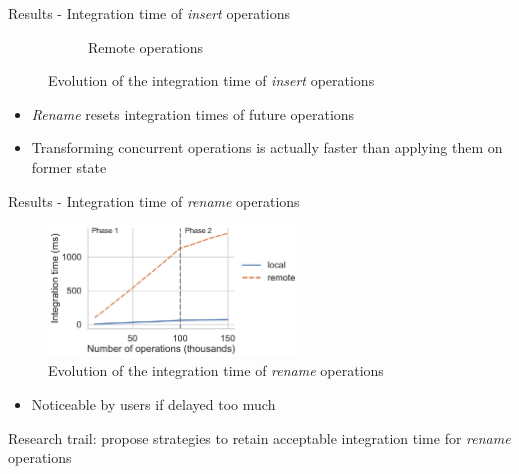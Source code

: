 \documentclass[10pt]{beamer}
\begin{document}
\begin{frame}{Results - Integration time of \emph{insert} operations}
\begin{figure}
\begin{subfigure}{0.47\textwidth}
        \caption{Remote operations}
        \label{fig:evolution-integration-time-remote-insert-remove}
    \end{subfigure}
    \caption{Evolution of the integration time of \emph{insert} operations}
    \label{fig:evolution-integration-time-insert-remove}
  \end{figure}

  \vspace{-1\baselineskip}
  \begin{itemize}
    \item \emph{Rename} resets integration times of future operations
    \item Transforming concurrent operations is actually faster than applying them on former state
  \end{itemize}

\end{frame}

\begin{frame}{Results - Integration time of \emph{rename} operations}
  \begin{figure}
    \centering
    \includegraphics[width=0.6\textwidth]{img/integration-time-rename.pdf}
    \caption{Evolution of the integration time of \emph{rename} operations}
    \label{fig:evolution-integration-time-rename}
  \end{figure}

  \vspace{-1\baselineskip}
  \begin{itemize}
    \item Noticeable by users if delayed too much
  \end{itemize}

  \centering
  \alert{Research trail: propose strategies to retain acceptable integration time for \emph{rename} operations}
\end{frame}
\end{document}
